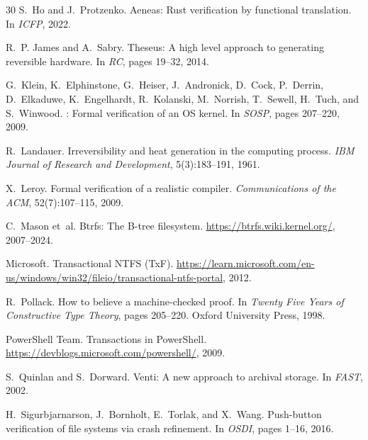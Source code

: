 \documentclass[11pt,a4paper]{article}
\begin{document}
\begin{thebibliography}{30}
S.~Ho and J.~Protzenko.
\newblock Aeneas: Rust verification by functional translation.
\newblock In \emph{ICFP}, 2022.

R.~P. James and A.~Sabry.
\newblock Theseus: A high level approach to generating reversible hardware.
\newblock In \emph{RC}, pages 19--32, 2014.

G.~Klein, K.~Elphinstone, G.~Heiser, J.~Andronick, D.~Cock, P.~Derrin,
  D.~Elkaduwe, K.~Engelhardt, R.~Kolanski, M.~Norrish, T.~Sewell, H.~Tuch,
  and S.~Winwood.
: Formal verification of an {OS} kernel.
\newblock In \emph{SOSP}, pages 207--220, 2009.

R.~Landauer.
\newblock Irreversibility and heat generation in the computing process.
\newblock \emph{IBM Journal of Research and Development}, 5(3):183--191, 1961.

X.~Leroy.
\newblock Formal verification of a realistic compiler.
\newblock \emph{Communications of the ACM}, 52(7):107--115, 2009.

C.~Mason et~al.
\newblock Btrfs: The {B-tree} filesystem.
\newblock \url{https://btrfs.wiki.kernel.org/}, 2007--2024.

Microsoft.
\newblock Transactional {NTFS} ({TxF}).
\newblock \url{https://learn.microsoft.com/en-us/windows/win32/fileio/transactional-ntfs-portal},
  2012.

R.~Pollack.
\newblock How to believe a machine-checked proof.
\newblock In \emph{Twenty Five Years of Constructive Type Theory}, pages
  205--220. Oxford University Press, 1998.

{PowerShell Team}.
\newblock Transactions in {PowerShell}.
\newblock \url{https://devblogs.microsoft.com/powershell/}, 2009.

S.~Quinlan and S.~Dorward.
\newblock Venti: A new approach to archival storage.
\newblock In \emph{FAST}, 2002.

H.~Sigurbjarnarson, J.~Bornholt, E.~Torlak, and X.~Wang.
\newblock Push-button verification of file systems via crash refinement.
\newblock In \emph{OSDI}, pages 1--16, 2016.


\end{thebibliography}
\end{document}
